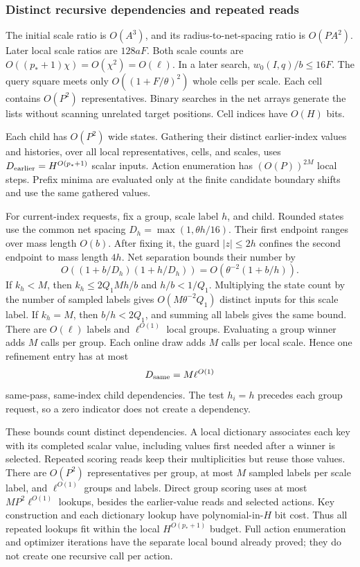 \documentclass[11pt]{article}
\theoremstyle{definition}
\newcommand{\1}{\mathbf 1}
\begin{document}
\subsubsection{Distinct recursive dependencies and repeated reads}

The initial scale ratio is $O(A^3)$, and its radius-to-net-spacing
ratio is $O(PA^2)$. Later local scale ratios are $128aF$.
Both scale counts are $O((p_*+1)\chi)=O(\chi^2)=O(\ell)$.
In a later search, $w_0(I,q)/b\le16F$.
The query square meets only $O((1+F/\theta)^2)$ whole cells per scale.
Each cell contains $O(P^2)$ representatives.
Binary searches in the net arrays generate the lists without scanning
unrelated target positions. Cell indices have $O(H)$ bits.

Each child has $O(P^2)$ wide states.
Gathering their distinct earlier-index values and histories, over all
local representatives, cells, and scales, uses
$D_{\rm earlier}=H^{O(p_*+1)}$ scalar inputs.
Action enumeration has $(O(P))^{2M}$ local steps.
Prefix minima are evaluated only at the finite candidate boundary shifts
and use the same gathered values.

For current-index requests, fix a group, scale label $h$, and child.
Rounded states use the common net spacing
$D_h=\max(1,\theta h/16)$.
Their first endpoint ranges over mass length $O(b)$.
After fixing it, the guard $|z|\le2h$ confines the second endpoint
to mass length $4h$. Net separation bounds their number by
\[
 O((1+b/D_h)(1+h/D_h))
 =O(\theta^{-2}(1+b/h)).
\]
If $k_h<M$, then $k_h\le2Q_1Mh/b$ and $h/b<1/Q_1$.
Multiplying the state count by the number of sampled labels gives
$O(M\theta^{-2}Q_1)$ distinct inputs for this scale label.
If $k_h=M$, then $b/h<2Q_1$, and summing all labels gives the same bound.
There are $O(\ell)$ labels and $\ell^{O(1)}$ local groups.
Evaluating a group winner adds $M$ calls per group.
Each online draw adds $M$ calls per local scale.
Hence one refinement entry has at most
\[
 D_{\rm same}=M\ell^{O(1)}
\]
same-pass, same-index child dependencies.
The test $h_i=h$ precedes each group request, so a zero indicator does
not create a dependency.

These bounds count distinct dependencies.
A local dictionary associates each key with its completed scalar value,
including values first needed after a winner is selected.
Repeated scoring reads keep their multiplicities but reuse those values.
There are $O(P^2)$ representatives per group, at most $M$ sampled labels
per scale label, and $\ell^{O(1)}$ groups and labels.
Direct group scoring uses at most
$MP^2\ell^{O(1)}$ lookups, besides the earlier-value reads and selected
actions. Key construction and each dictionary lookup have
polynomial-in-$H$ bit cost.
Thus all repeated lookups fit within the local
$H^{O(p_*+1)}$ budget.
Full action enumeration and optimizer iterations have the separate local
bound already proved; they do not create one recursive call per action.
\end{document}
